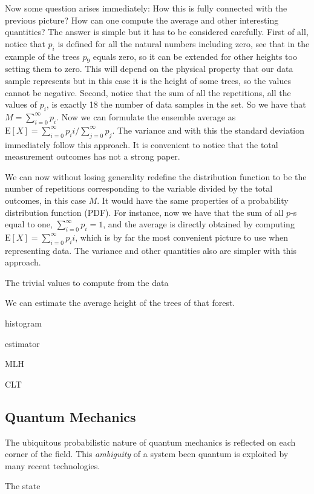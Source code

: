 Now some question arises immediately:
How this is fully connected with the previous picture?
How can one compute the average and other interesting quantities?
The answer is simple but it has to be considered carefully.
First of all, notice that $p_i$ is defined for all the natural numbers including zero, see that in the example of the trees $p_9$ equals zero, so it can be extended for other heights too setting them to zero.
This will depend on the physical property that our data sample represents but in this case it is the height of some trees, so the values cannot be negative.
Second, notice that the sum of all the repetitions, all the values of $p_i$, is exactly 18 the number of data samples in the set.
So we have that $M = \sum_{i=0}^{\infty} p_i$.
Now we can formulate the ensemble average as $\text{E}[X]=\sum_{i=0}^{\infty} p_i i / \sum_{j=0}^{\infty} p_j$. The variance and with this the standard deviation immediately follow this approach.
It is convenient to notice that the total measurement outcomes has not a strong paper.

We can now without losing generality redefine the distribution function to be the number of repetitions corresponding to the variable divided by the total outcomes, in this case $M$.
It would have the same properties of a probability distribution function (PDF).
For instance, now we have that the sum of all $p$-s equal to one, $\sum_{i=0}^\infty p_i = 1$, and the average is directly obtained by computing  $\text{E}[X] = \sum_{i=0}^\infty p_i i$, which is by far the most convenient picture to use when representing data. The variance and other quantities also are simpler with this approach.

The trivial values to compute from the data

We can estimate the average height of the trees of that forest.

histogram

estimator

MLH

CLT




\subsection{Quantum Mechanics}
The ubiquitous probabilistic nature of quantum mechanics is reflected on each corner of the field.
This \emph{ambiguity} of a system been quantum is exploited by many recent technologies.

The state

